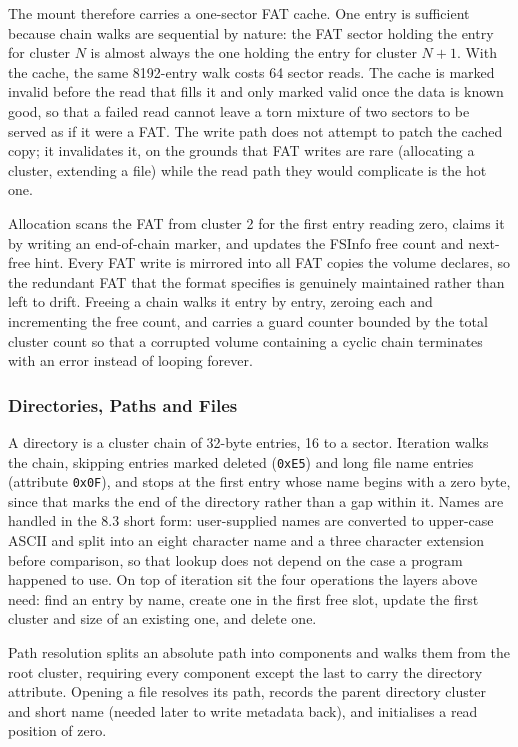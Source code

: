 The mount therefore carries a one-sector FAT cache. One entry is sufficient
because chain walks are sequential by nature: the FAT sector holding the entry
for cluster $N$ is almost always the one holding the entry for cluster $N+1$.
With the cache, the same 8192-entry walk costs 64 sector reads. The cache is
marked invalid before the read that fills it and only marked valid once the
data is known good, so that a failed read cannot leave a torn mixture of two
sectors to be served as if it were a FAT. The write path does not attempt to
patch the cached copy; it invalidates it, on the grounds that FAT writes are
rare (allocating a cluster, extending a file) while the read path they would
complicate is the hot one.

Allocation scans the FAT from cluster 2 for the first entry reading zero,
claims it by writing an end-of-chain marker, and updates the FSInfo free count
and next-free hint. Every FAT write is mirrored into all FAT copies the volume
declares, so the redundant FAT that the format specifies is genuinely
maintained rather than left to drift. Freeing a chain walks it entry by entry,
zeroing each and incrementing the free count, and carries a guard counter
bounded by the total cluster count so that a corrupted volume containing a
cyclic chain terminates with an error instead of looping forever.

\subsubsection{Directories, Paths and Files}

A directory is a cluster chain of 32-byte entries, 16 to a sector. Iteration
walks the chain, skipping entries marked deleted (\texttt{0xE5}) and long file
name entries (attribute \texttt{0x0F}), and stops at the first entry whose name
begins with a zero byte, since that marks the end of the directory rather than
a gap within it. Names are handled in the 8.3 short form: user-supplied names
are converted to upper-case ASCII and split into an eight character name and a
three character extension before comparison, so that lookup does not depend on
the case a program happened to use. On top of iteration sit the four operations
the layers above need: find an entry by name, create one in the first free
slot, update the first cluster and size of an existing one, and delete one.

Path resolution splits an absolute path into components and walks them from the
root cluster, requiring every component except the last to carry the directory
attribute. Opening a file resolves its path, records the parent directory
cluster and short name (needed later to write metadata back), and initialises a
read position of zero.

